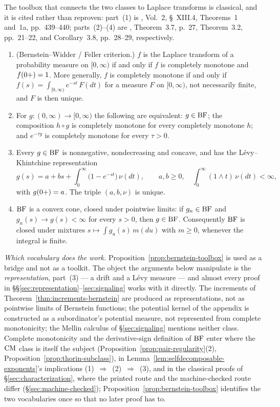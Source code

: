 The toolbox that connects the two classes to Laplace transforms is classical, and it is
cited rather than reproven: part~(1) is , Vol.~2,
\S~XIII.4, Theorems~1 and~1a, pp.~439--440; parts~(2)--(4) are
, Theorem~3.7, p.~27, Theorem~3.2, pp.~21--22, and
Corollary~3.8, pp.~28--29, respectively.

\begin{proposition}\label{prop:bernstein-toolbox}
\begin{enumerate}
\item (Bernstein--Widder / Feller criterion.) $f$ is the Laplace transform of a probability
measure on $[0,\infty)$ if and only if $f$ is completely monotone and $f(0{+}) = 1$. More
generally, $f$ is completely monotone if and only if $f(s) = \int_{[0,\infty)} e^{-st}\,F(dt)$
for a measure $F$ on $[0,\infty)$, not necessarily finite, and $F$ is then unique.
\item For $g : (0,\infty) \to [0,\infty)$ the following are equivalent: $g \in \mathrm{BF}$; the
composition $h \circ g$ is completely monotone for every completely monotone $h$; and
$e^{-\tau g}$ is completely monotone for every $\tau > 0$.
\item Every $g \in \mathrm{BF}$ is nonnegative, nondecreasing and concave, and has the
Lévy--Khintchine representation
\[
  g(s) = a + b s + \int_0^\infty \bigl(1 - e^{-st}\bigr)\,\nu(dt), \qquad
  a, b \ge 0, \quad \int_0^\infty (1 \wedge t)\,\nu(dt) < \infty,
\]
with $g(0{+}) = a$. The triple $(a, b, \nu)$ is unique.
\item $\mathrm{BF}$ is a convex cone, closed under pointwise limits: if $g_n \in \mathrm{BF}$ and
$g_n(s) \to g(s) < \infty$ for every $s > 0$, then $g \in \mathrm{BF}$. Consequently $\mathrm{BF}$ is closed
under mixtures $s \mapsto \int g_u(s)\,m(du)$ with $m \ge 0$, whenever the integral is finite.
\end{enumerate}
\end{proposition}

\emph{Which vocabulary does the work.} Proposition~\ref{prop:bernstein-toolbox} is used as a
bridge and not as a toolkit. The object the arguments below manipulate is the
\emph{representation}, part~(3) --- a drift and a Lévy measure --- and almost every proof in
\S\S\ref{sec:representation}--\ref{sec:signaling} works with it directly. The increments of
Theorem~\ref{thm:increments-bernstein} are produced as representations, not as pointwise
limits of Bernstein functions; the potential kernel of the appendix is constructed as a
subordinator's potential measure, not represented from complete monotonicity; the Mellin
calculus of \S\ref{sec:signaling} mentions neither class. Complete monotonicity and the
derivative-sign definition of $\mathrm{BF}$ enter where the $\mathrm{CM}$ class is itself the subject
(Proposition~\ref{prop:pair-regularity}(2), Proposition~\ref{prop:thorin-subclass}), in
Lemma~\ref{lem:selfdecomposable-exponents}'s implications
(1)~$\Rightarrow$~(2)~$\Rightarrow$~(3), and in the classical proofs of \S\ref{sec:characterization},
where the printed route and the machine-checked route differ
(\S\ref{sec:machine-checked}); Proposition~\ref{prop:bernstein-toolbox} identifies the two
vocabularies once so that no later proof has to.

